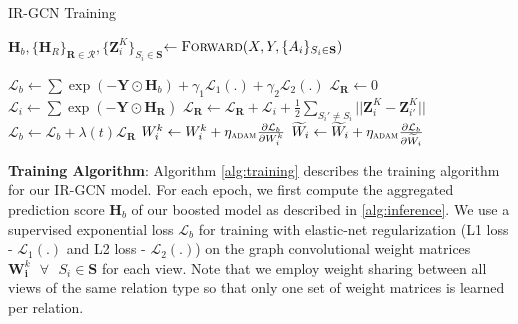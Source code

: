 \begin{algorithm}[!h]
\caption{IR-GCN Training}\label{alg:training}
\begin{algorithmic}[1]
    \State $\mathbf{H}_b, \{ \mathbf{H}_{R} \}_{\mathbf{R} \in \mathcal{R}}, \{ \mathbf{Z}^{K}_{i} \}_{S_i \in \mathbf{S}}$$\gets \textsc{Forward}(X, Y, \{ A_i \}_{S_i \in \mathbf{S}})$
    \State {}

        \State $\mathcal L_b \gets \sum \exp({-\mathbf{Y} \odot \mathbf{H}_b}) + \gamma_1 \mathcal L_1(.) + \gamma_2 \mathcal L_2(.)$
    \State {}
  \State {}
        \State $\mathcal L_{\mathbf{R}} \gets 0$
        \State $\mathcal L_{i} \gets \sum \exp({-\mathbf{Y} \odot \mathbf{H}_\mathbf{R}})$
    \State $\mathcal L_{\mathbf{R}} \gets \mathcal L_{\mathbf{R}} + \mathcal L_{i} + \frac{1}{2}\sum_{S_i' \neq S_i}\lvert\lvert \mathbf{Z}_{i}^K - \mathbf{Z}_{i'}^K \lvert\lvert $
    \EndFor
    \State $\mathcal L_b \gets \mathcal L_b + \lambda(t) \mathcal L_{\mathbf{R}}$
    \State    $W_i^{k} \gets  W_i^{k} + \eta_{\textsc{adam}} \frac{\partial \mathcal L_b}{\partial W_i^{k}} $ 
     \State    $\widetilde{W}_i \gets  \widetilde{W}_i +  \eta_{\textsc{adam}} \frac{\partial \mathcal L_b}{\partial \widetilde{W}_i}$ 
    \EndFor
\EndFor
\end{algorithmic}
\end{algorithm}

\noindent
\textbf{Training Algorithm}: Algorithm \ref{alg:training} describes the training algorithm for our IR-GCN model. For each epoch, we first compute the aggregated prediction score $\mathbf{H}_{b}$ of our boosted model as described in \cref{alg:inference}. We use a supervised exponential loss $\mathcal{L}_b$ for training with elastic-net regularization (L1 loss - $\mathcal L_1(.)$ and L2 loss - $\mathcal L_2(.) $) on the graph convolutional weight matrices $\mathbf{W}_{\mathbf{i}}^{k} \texttt{  }\forall\texttt{ } S_i \in \mathbf{S}$ for each view. Note that we employ weight sharing between all views of the same relation type so that only one set of weight matrices is learned per relation. %


